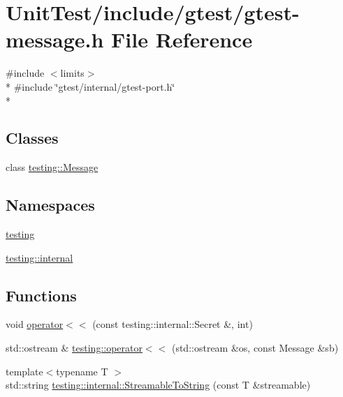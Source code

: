 \hypertarget{gtest-message_8h}{\section{Unit\+Test/include/gtest/gtest-\/message.h File Reference}
\label{gtest-message_8h}
}
{\ttfamily \#include $<$limits$>$}\\*
{\ttfamily \#include \char`\"{}gtest/internal/gtest-\/port.\+h\char`\"{}}\\*
\subsection*{Classes}
\begin{DoxyCompactItemize}
\item 
class \hyperlink{classtesting_1_1_message}{testing\+::\+Message}
\end{DoxyCompactItemize}
\subsection*{Namespaces}
\begin{DoxyCompactItemize}
\item 
 \hyperlink{namespacetesting}{testing}
\item 
 \hyperlink{namespacetesting_1_1internal}{testing\+::internal}
\end{DoxyCompactItemize}
\subsection*{Functions}
\begin{DoxyCompactItemize}
\item 
void \hyperlink{gtest-message_8h_ae8f0c86e5c506587b62315e24a918563}{operator$<$$<$} (const testing\+::internal\+::\+Secret \&, int)
\item 
std\+::ostream \& \hyperlink{namespacetesting_a7b802e532fd68749765cb7dc156130db}{testing\+::operator$<$$<$} (std\+::ostream \&os, const Message \&sb)
\item 
{\footnotesize template$<$typename T $>$ }\\std\+::string \hyperlink{namespacetesting_1_1internal_aad4beed95d0846e6ffc5da0978ef3bb9}{testing\+::internal\+::\+Streamable\+To\+String} (const T \&streamable)
\end{DoxyCompactItemize}


